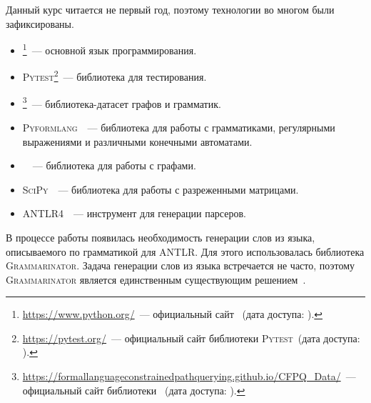 Данный курс читается не первый год, поэтому технологии во многом были зафиксированы.
\begin{itemize}
    \item \python{}\footnote{\url{https://www.python.org/}~--- официальный сайт \python{}~(дата доступа: ).}~--- основной язык программирования.
    \item \textsc{Pytest}\footnote{\url{https://pytest.org/}~--- официальный сайт библиотеки \textsc{Pytest}~(дата доступа: ).}~--- библиотека для тестирования.
    \item \cfpqdata{}\footnote{\url{https://formallanguageconstrainedpathquerying.github.io/CFPQ_Data/}~--- официальный сайт библиотеки \cfpqdata{}~(дата доступа: ).}~--- библиотека-датасет графов и грамматик.
    \item \textsc{Pyformlang}~\cite{romeroPyformlangEducationalLibrary2021}~--- библиотека для работы с грамматиками, регулярными выражениями и различными конечными автоматами.
    \item \networkx{}~\cite{SciPyProceedings_11}~--- библиотека для работы с графами.
    \item \textsc{SciPy}~\cite{virtanenSciPyFundamentalAlgorithms2020}~--- библиотека для работы с разреженными матрицами.
    \item \textsc{ANTLR4}~\cite{parrDefinitiveANTLRReference2013}~--- инструмент для генерации парсеров.
\end{itemize}

В процессе работы появилась необходимость генерации слов из языка, описываемого по грамматикой для ANTLR.
Для этого использовалась библиотека \textsc{Grammarinator}.
Задача генерации слов из языка встречается не часто, поэтому \textsc{Grammarinator} является единственным существующим решением~\cite{GeneratingGrammarconformantTexts}.
